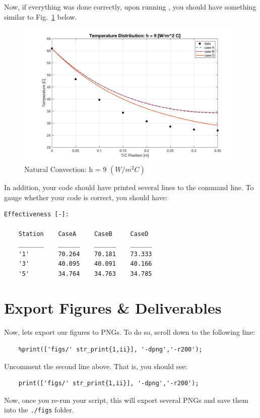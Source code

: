 \documentclass[11pt, letterpaper]{article}
\begin{document}
\n
Now, if everything was done correctly, upon running , you should have something similar to Fig.~\ref{fig1} below.

\begin{figure}[H]
    \begin{center}
        \includegraphics[width=125mm]{gfx/h09.png}
    \caption{Natural Convection: h = 9 $(W/m^2 C)$}\label{fig1}
    \end{center}
\end{figure}

\n
In addition, your code should have printed several lines to the command line. To gauge whether your code is correct, you should have:

\begin{lstlisting}[numbers=none]
 Effectiveness [-]:
 
    Station    CaseA     CaseB     CaseD 
    _______    ______    ______    ______
    '1'        70.264    70.181    73.333
    '3'        40.095    40.091    40.166
    '5'        34.764    34.763    34.785

\end{lstlisting}


\n
\section{Export Figures \& Deliverables}

Now, lets export our figures to PNGs. To do so, scroll down to the following line:

\begin{lstlisting}[numbers=none]
    % print figs
    %print(['figs/' str_print{1,ii}], '-dpng','-r200');
\end{lstlisting}

\n
Uncomment the second line above. That is, you should see:
\begin{lstlisting}[numbers=none]
    % print figs
    print(['figs/' str_print{1,ii}], '-dpng','-r200');
\end{lstlisting}
\n
Now, once you re-run your script, this will export several PNGs and save them into the \texttt{./figs} folder.
\end{document}

